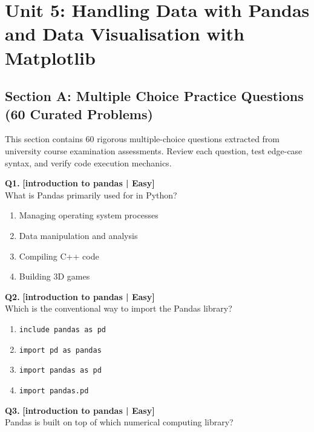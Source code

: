 \chapter{Unit 5: Handling Data with Pandas and Data Visualisation with Matplotlib}

\section{Section A: Multiple Choice Practice Questions (60 Curated Problems)}

\noindent This section contains 60 rigorous multiple-choice questions extracted from university course examination assessments. Review each question, test edge-case syntax, and verify code execution mechanics.
\vspace{3mm}

\noindent\textbf{Q1.} \hfill {\small\color{LPUOrange}\textbf{[introduction to pandas | Easy]}}\\[2pt]
What is Pandas primarily used for in Python?

\begin{enumerate}[label=(\alph*),topsep=2pt,itemsep=1pt,partopsep=0pt,parsep=0pt]
    \item \relax Managing operating system processes
    \item \relax Data manipulation and analysis
    \item \relax Compiling C++ code
    \item \relax Building 3D games
\end{enumerate}
\vspace{2mm}

\noindent\textbf{Q2.} \hfill {\small\color{LPUOrange}\textbf{[introduction to pandas | Easy]}}\\[2pt]
Which is the conventional way to import the Pandas library?

\begin{enumerate}[label=(\alph*),topsep=2pt,itemsep=1pt,partopsep=0pt,parsep=0pt]
    \item \relax \texttt{include pandas as pd}
    \item \relax \texttt{import pd as pandas}
    \item \relax \texttt{import pandas as pd}
    \item \relax \texttt{import pandas.pd}
\end{enumerate}
\vspace{2mm}

\noindent\textbf{Q3.} \hfill {\small\color{LPUOrange}\textbf{[introduction to pandas | Easy]}}\\[2pt]
Pandas is built on top of which numerical computing library?

